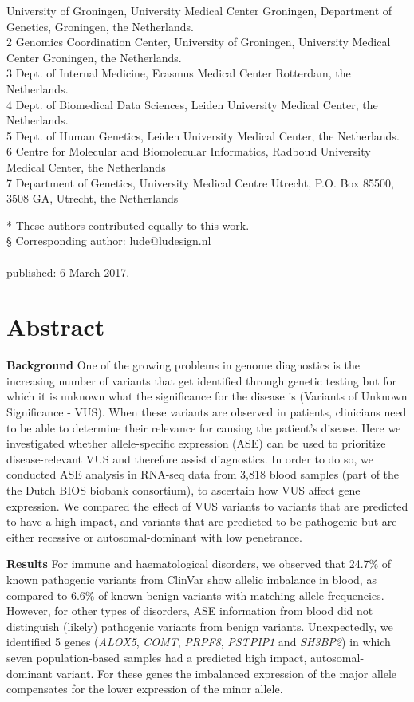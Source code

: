  University of Groningen, University Medical Center Groningen, Department of Genetics, Groningen, the Netherlands.\\
2 Genomics Coordination Center, University of Groningen, University Medical Center Groningen, the Netherlands.\\
3 Dept. of Internal Medicine, Erasmus Medical Center Rotterdam, the Netherlands.\\
4 Dept. of Biomedical Data Sciences, Leiden University Medical Center, the Netherlands.\\
5 Dept. of Human Genetics, Leiden University Medical Center, the Netherlands.\\
6 Centre for Molecular and Biomolecular Informatics, Radboud University Medical Center, the Netherlands\\
7 Department of Genetics, University Medical Centre Utrecht, P.O. Box 85500, 3508 GA, Utrecht, the Netherlands

* These authors contributed equally to this work.\\
§ Corresponding author: lude@ludesign.nl
\\
\\
\noindent
published: 6 March 2017.

\newpage

\section*{Abstract}
\textbf{Background} One of the growing problems in genome diagnostics is the increasing number of variants that get identified through genetic testing but for which it is unknown what the significance for the disease is (Variants of Unknown Significance - VUS)\cite{hoffman-andrewsKnownUnknownChallenges2018,direstaNextgenerationSequencingApproach2018}. When these variants are observed in patients, clinicians need to be able to determine their relevance for causing the patient’s disease. Here we investigated whether allele-specific expression (ASE) can be used to prioritize disease-relevant VUS and therefore assist diagnostics. In order  to do so, we conducted ASE analysis in RNA-seq data from 3,818 blood samples (part of the the Dutch BIOS biobank consortium), to ascertain how VUS affect gene expression. We compared the effect of VUS variants to variants that are predicted to have a high impact, and variants that are predicted to be pathogenic but are either recessive or autosomal-dominant with low penetrance.


\textbf{Results} For immune and haematological disorders, we observed that 24.7\% of known pathogenic variants from ClinVar show allelic imbalance in blood, as compared to 6.6\% of known benign variants with matching allele frequencies. However, for other types of disorders, ASE information from blood did not distinguish (likely) pathogenic variants from benign variants. Unexpectedly, we identified 5 genes (\textit{ALOX5}, \textit{COMT}, \textit{PRPF8}, \textit{PSTPIP1} and \textit{SH3BP2}) in which seven population-based samples had a predicted high impact, autosomal-dominant variant. For these genes the imbalanced expression of the major allele compensates for the lower expression of the minor allele.


